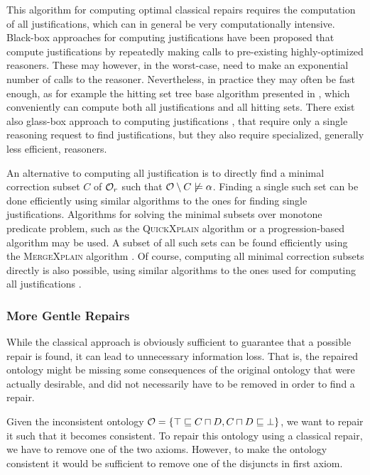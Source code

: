 This algorithm for computing optimal classical repairs requires the computation of all justifications, which can in general be very computationally intensive. Black-box approaches for computing justifications have been proposed \cite{kalyanpur2007finding,schlobach2003non,schlobach2007debugging} that compute justifications by repeatedly making calls to pre-existing highly-optimized reasoners. These may however, in the worst-case, need to make an exponential number of calls to the reasoner. Nevertheless, in practice they may often be fast enough, as for example the hitting set tree base algorithm presented in \cite{kalyanpur2007finding}, which conveniently can compute both all justifications and all hitting sets. There exist also glass-box approach to computing justifications \cite{kalyanpur2007finding}, that require only a single reasoning request to find justifications, but they also require specialized, generally less efficient, reasoners.

An alternative to computing all justification is to directly find a minimal correction subset $C$ of $\mathcal{O}_r$ such that $\mathcal{O} \setminus C \not\models \alpha$. Finding a single such set can be done efficiently using similar algorithms to the ones for finding single justifications. Algorithms for solving the minimal subsets over monotone predicate problem, such as the \textsc{QuickXplain} algorithm \cite{junker2004preferred} or a progression-based algorithm \cite{marques2013minimal} may be used. A subset of all such sets can be found efficiently using the \textsc{MergeXplain} algorithm \cite{shchekotykhin2015mergexplain}. Of course, computing all minimal correction subsets directly is also possible, using similar algorithms to the ones used for computing all justifications \cite{malouf2007maximal}.

\subsubsection{More Gentle Repairs} \label{more-gentle-repairs}

While the classical approach is obviously sufficient to guarantee that a possible repair is found, it can lead to unnecessary information loss. That is, the repaired ontology might be missing some consequences of the original ontology that were actually desirable, and did not necessarily have to be removed in order to find a repair.

\begin{example}
  Given the inconsistent ontology $\mathcal{O} = \{ \top \sqsubseteq C \sqcap D, C \sqcap D \sqsubseteq \bot \}$, we want to repair it such that it becomes consistent. To repair this ontology using a classical repair, we have to remove one of the two axioms. However, to make the ontology consistent it would be sufficient to remove one of the disjuncts in first axiom.
\end{example}

